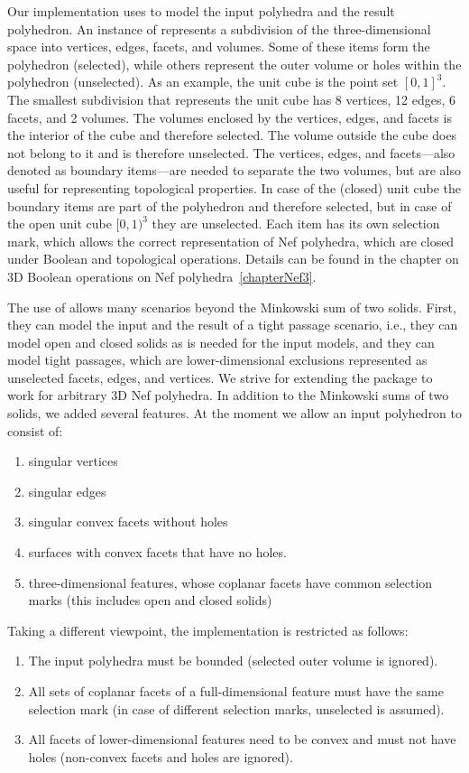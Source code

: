 Our implementation uses  to model the input
polyhedra and the result polyhedron. An instance of
 represents a subdivision of the
three-dimensional space into vertices, edges, facets, and
volumes. Some of these items form the polyhedron (selected), while
others represent the outer volume or holes within the polyhedron
(unselected). As an example, the unit cube is the point set
$[0,1]^3$. The smallest subdivision that represents the unit cube has
8 vertices, 12 edges, 6 facets, and 2 volumes. The volumes enclosed by
the vertices, edges, and facets is the interior of the cube and
therefore selected. The volume outside the cube does not belong to it
and is therefore unselected. The vertices, edges, and facets---also
denoted as boundary items---are needed to separate the two volumes,
but are also useful for representing topological properties. In case
of the (closed) unit cube the boundary items are part of the
polyhedron and therefore selected, but in case of the open unit cube
$[0,1)^3$ they are unselected. Each item has its own selection mark,
which allows the correct representation of Nef polyhedra, which are
closed under Boolean and topological operations. Details can be found
in the chapter on 3D Boolean operations on Nef polyhedra~\ref{chapterNef3}.

The use of  allows many scenarios beyond the
Minkowski sum of two solids. First, they can model the input and the
result of a tight passage scenario, i.e., they can model open and
closed solids as is needed for the input models, and they can model
tight passages, which are lower-dimensional exclusions represented as
unselected facets, edges, and vertices. We strive for extending the
package to work for arbitrary 3D Nef polyhedra. In addition to the
Minkowski sums of two solids, we added several features. At the moment
we allow an input polyhedron to consist of:
\begin{enumerate}
\item singular vertices
\item singular edges
\item singular convex facets without holes
\item surfaces with convex facets that have no holes.
\item three-dimensional features, whose coplanar facets have
common selection marks (this includes open and closed solids)
\end{enumerate}

Taking a different viewpoint, the implementation is restricted as
follows:
\begin{enumerate}
\item The input polyhedra must be bounded (selected outer volume is ignored).
\item All sets of coplanar facets of a full-dimensional
feature must have the same selection mark (in case of different
selection marks, unselected is assumed).
\item All facets of lower-dimensional features need to be convex and 
must not have holes (non-convex facets and holes are ignored).
\end{enumerate}

